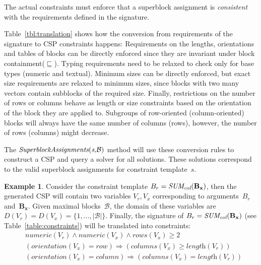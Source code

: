 \documentclass{IEEEtran}
\newcommand{\format}[1]{\textit{#1}\xspace}
\newcommand{\generategroups}{\format{SuperblockAssignments}}
\newcommand{\blocks}{\ensuremath{\mathcal{B}}\xspace}
\newcommand{\eccalc}[2]{\ensuremath{#1 = #2}}
\newcommand{\ecseries}[1]{\ensuremath{\textit{SERIES}(#1)}}
\newcommand{\ecsumc}[2]{\eccalc{#1}{\textit{SUM\textsubscript{col}}(#2)}}
\newcommand{\numeric}{\format{numeric}}
\newcommand{\plength}{\format{length}}
\newcommand{\por}{\format{orientation}}
\newcommand{\prows}{\format{rows}}
\newcommand{\pcols}{\format{columns}}
\newcommand{\sg}{B}
\theoremstyle{definition}
\newtheorem{example}{Example}
\begin{document}
%
The actual constraints must enforce that a superblock assignment is \textit{consistent} with the requirements defined in the signature.
%

Table~\ref{tbl:translation} shows how the conversion from requirements of the signature to CSP constraints happens:
Requirements on the lengths, orientations and tables of blocks can be directly enforced since they are invariant under block containment($\sqsubseteq$).
Typing requirements need to be relaxed to check only for base types (numeric and textual).
Minimum sizes can be directly enforced, but exact size requirements are relaxed to minimum sizes, since blocks with two many vectors contain subblocks of the required size.
Finally, restrictions on the number of rows or columns behave as length or size constraints based on the orientation of the block they are applied to.
Subgroups of row-oriented (column-oriented) blocks will always have the same number of columns (rows), however, the number of rows (columns) might decrease.

The $\generategroups(\textit{s,\blocks})$ method will use these conversion rules to construct a CSP and query a solver for all solutions.
These solutions correspond to the valid superblock assignments for constraint template~$s$.

\begin{example}

  Consider the constraint template $\ecsumc{\sg_r}{\mathbf{\sg_x}}$, then the generated CSP will contain two variables $V_r, V_x$ corresponding to arguments~$\sg_r$ and~$\mathbf{\sg_x}$.
  Given maximal blocks~\blocks, the domain of these variables are $D(V_r) = D(V_x) = \{ 1, \dots, |\blocks| \}$.
  Finally, the signature of $\ecsumc{\sg_r}{\mathbf{\sg_x}}$ (see Table~\ref{table:constraints}) will be translated into constraints:
  \begin{align*}
    & \numeric(V_r) \land \numeric(V_x) \land \prows(V_x) \geq 2 \\
    & (\por(V_x) = \mathit{row}) \Rightarrow (\pcols(V_x) \geq \plength(V_r)) \\
    & (\por(V_x) = \mathit{column}) \Rightarrow (\pcols(V_x) = \plength(V_r))
  \end{align*}
\end{example}
\end{document}
